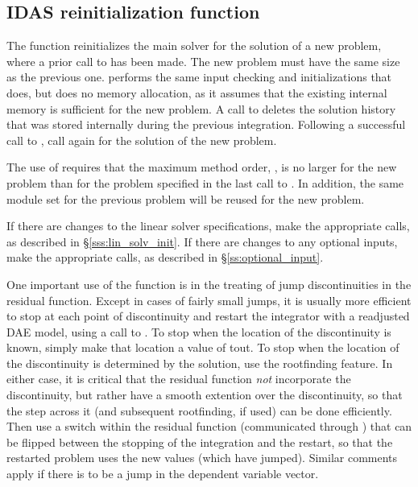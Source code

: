 {%

\subsection{IDAS reinitialization function}\label{sss:idareinit}

The function  reinitializes the main {\idas} solver for
the solution of a new problem, where a prior call to  has
been made. The new problem must have the same size as the previous one.
 performs the same input checking and initializations 
that  does, but does no memory allocation, as it assumes that
the existing internal memory is sufficient for the new problem.
A call to  deletes the solution history that was stored
internally during the previous integration.  Following a successful call to
, call  again for the solution of the new problem.

The use of  requires that the maximum method order,    
, is no larger for the new problem than for the problem  
specified in the last call to .  In addition, the same
{\nvector} module set for the previous problem
will be reused for the new problem.

If there are changes to the linear solver specifications, make the
appropriate  calls, as described in \S\ref{sss:lin_solv_init}.
If there are changes to any optional inputs, make the appropriate
 calls, as described in \S\ref{ss:optional_input}.

One important use of the  function is in the treating
of jump discontinuities in the residual function.  Except in cases of
fairly small jumps, it is usually more efficient to stop at each point
of discontinuity and restart the integrator with a readjusted DAE
model, using a call to .  To stop when the location of
the discontinuity is known, simply make that location a value of tout.
To stop when the location of the discontinuity is determined by the
solution, use the rootfinding feature.  In either case, it is critical
that the residual function {\it not} incorporate the discontinuity, but
rather have a smooth extention over the discontinuity, so that the
step across it (and subsequent rootfinding, if used) can be done
efficiently.  Then use a switch within the residual function (communicated
through ) that can be flipped between the stopping of
the integration and the restart, so that the restarted problem uses
the new values (which have jumped).  Similar comments apply if there
is to be a jump in the dependent variable vector.

}
